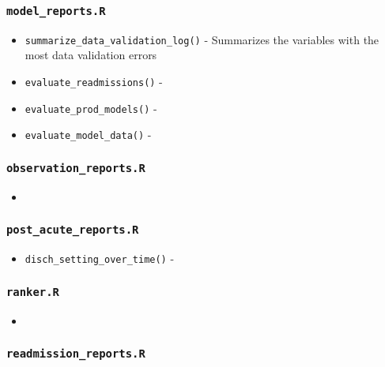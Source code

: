 \documentclass[
]{book}
\providecommand{\tightlist}{%
  \setlength{\itemsep}{0pt}\setlength{\parskip}{0pt}}
\begin{document}
\hypertarget{model_reports.r}{%
\subsubsection{\texorpdfstring{\texttt{model\_reports.R}}{model\_reports.R}}\label{model_reports.r}}

\begin{itemize}
\tightlist
\item
  \texttt{summarize\_data\_validation\_log()} - Summarizes the variables with the most data validation errors
\item
  \texttt{evaluate\_readmissions()} -
\item
  \texttt{evaluate\_prod\_models()} -
\item
  \texttt{evaluate\_model\_data()} -
\end{itemize}

\hypertarget{observation_reports.r}{%
\subsubsection{\texorpdfstring{\texttt{observation\_reports.R}}{observation\_reports.R}}\label{observation_reports.r}}

\begin{itemize}
\item
\end{itemize}

\hypertarget{post_acute_reports.r}{%
\subsubsection{\texorpdfstring{\texttt{post\_acute\_reports.R}}{post\_acute\_reports.R}}\label{post_acute_reports.r}}

\begin{itemize}
\tightlist
\item
  \texttt{disch\_setting\_over\_time()} -
\end{itemize}

\hypertarget{ranker.r}{%
\subsubsection{\texorpdfstring{\texttt{ranker.R}}{ranker.R}}\label{ranker.r}}

\begin{itemize}
\item
\end{itemize}

\hypertarget{readmission_reports.r}{%
\subsubsection{\texorpdfstring{\texttt{readmission\_reports.R}}{readmission\_reports.R}}\label{readmission_reports.r}}
\end{document}
